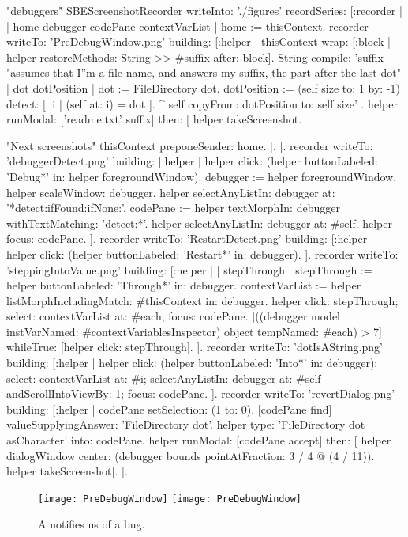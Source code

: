 \documentclass[a4paper,10pt,twoside]{book}
\begin{document}
\begin{ExecuteSmalltalkScript}
"debuggers"
SBEScreenshotRecorder writeInto: './figures' recordSeries: [:recorder |
	| home debugger codePane contextVarList |
	home := thisContext.
	recorder writeTo: 'PreDebugWindow.png' building: [:helper |
		thisContext wrap: [:block | helper restoreMethods: {String >> #suffix} after: block].
		String compile: 'suffix
	"assumes that I''m a file name, and answers my suffix, the part after the last dot"
	| dot dotPosition |
	dot := FileDirectory dot.
	dotPosition := (self size to: 1 by: -1) detect: [ :i | (self at: i) = dot ].
	^ self copyFrom: dotPosition to: self size'
.
		helper
			runModal: ['readme.txt' suffix]
			then: [
				helper takeScreenshot.
				
				"Next screenshots"
				thisContext preponeSender: home.
			].
	].
	recorder writeTo: 'debuggerDetect.png' building: [:helper |
		helper click: (helper buttonLabeled: 'Debug*' in: helper foregroundWindow).
		debugger := helper foregroundWindow.
		helper scaleWindow: debugger.
		helper selectAnyListIn: debugger at: '*detect:ifFound:ifNone:'.
		codePane := helper textMorphIn: debugger withTextMatching: 'detect:*'.
		helper selectAnyListIn: debugger at: #self.
		helper focus: codePane.
	].
	recorder writeTo: 'RestartDetect.png' building: [:helper |
		helper click: (helper buttonLabeled: 'Restart*' in: debugger).
	].
	recorder writeTo: 'steppingIntoValue.png' building: [:helper |
		| stepThrough |
		stepThrough := helper buttonLabeled: 'Through*' in: debugger.
		contextVarList := helper listMorphIncludingMatch: #thisContext in: debugger.
		helper
			click: stepThrough;
			select: contextVarList at: #each;
			focus: codePane.
		[((debugger model instVarNamed: #contextVariablesInspector) object tempNamed: #each) > 7]
			whileTrue: [helper click: stepThrough].
	].
	recorder writeTo: 'dotIsAString.png' building: [:helper |
		helper
			click: (helper buttonLabeled: 'Into*' in: debugger);
			select: contextVarList at: #i;
			selectAnyListIn: debugger at: #self andScrollIntoViewBy: 1;
			focus: codePane.
	].
	recorder writeTo: 'revertDialog.png' building: [:helper |
		codePane setSelection: (1 to: 0).
		[codePane find]
			valueSupplyingAnswer: 'FileDirectory dot'.
		helper type: 'FileDirectory dot asCharacter' into: codePane.
		helper
			runModal: [codePane accept]
			then: [
				helper dialogWindow center: (debugger bounds pointAtFraction: 3 / 4 @ (4 / 11)).
				helper takeScreenshot].
	].
]
\end{ExecuteSmalltalkScript}
\begin{figure}[btp]
	\begin{center}
	\ifluluelse
		{\texttt{[image: PreDebugWindow]}}
		{\texttt{[image: PreDebugWindow]}}
	\end{center}
	\caption{A  notifies us of a bug.}
	\label{fig:PreDebugWindow}
\end{figure}
\end{document}
